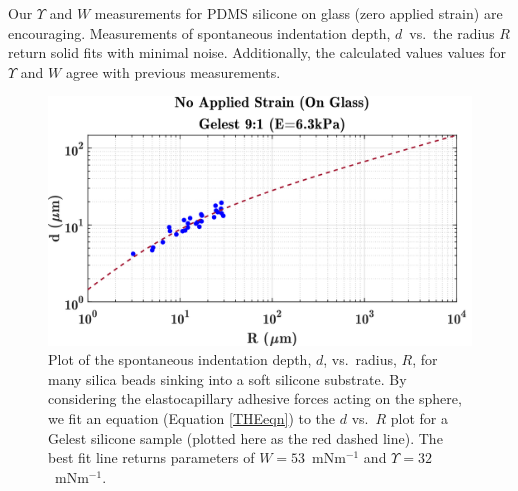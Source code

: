 Our $ \Upsilon $ and $ W $ measurements for PDMS silicone on glass (zero applied strain) are encouraging. Measurements of spontaneous indentation depth, $ d $~vs.~the radius $ R $ return solid fits with minimal noise. Additionally, the calculated values values for $ \Upsilon $ and $ W $ agree with previous measurements. 

\begin{figure}[h!]
	\centering
	\includegraphics[width=\linewidth]{Chapters/Figures/w_ups_fit_G9-1}
	\caption[Gelest W-$\Upsilon$ Fit]{Plot of the spontaneous indentation depth, $ d $, vs.~radius, $ R $, for many silica beads sinking into a soft silicone substrate. By considering the elastocapillary adhesive forces acting on the sphere, we fit an equation (Equation \ref{THEeqn}) to the $ d $ vs.~$R$ plot for a Gelest silicone sample (plotted here as the red dashed line). The best fit line returns parameters of $ W=53 $~mNm$^{-1}$  and $ \Upsilon=32 $~mNm$^{-1}$.}
	\label{fig:wupsfitg9-1}
\end{figure}

